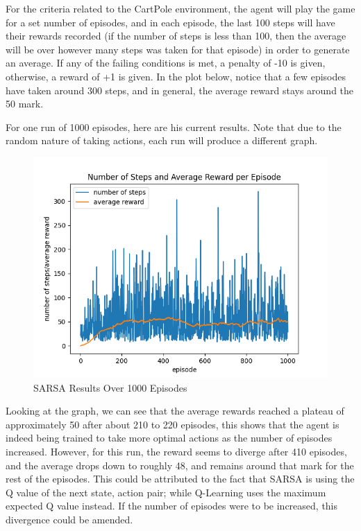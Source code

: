 \documentclass[nohyperref]{article}
\theoremstyle{plain}
\theoremstyle{definition}
\theoremstyle{remark}
\begin{document}
For the criteria related to the CartPole environment, the agent will play the game for a set number of episodes, and in each episode, the last 100 steps will have their rewards recorded (if the number of steps is less than 100, then the average will be over however many steps was taken for that episode) in order to generate an average.
If any of the failing conditions is met, a penalty of -10 is given, otherwise, a reward of +1 is given. In the plot below, notice that a few episodes have taken around 300 steps, and in general, the average reward stays around the 50 mark.

For one run of 1000 episodes, here are his current results. Note that due to the random nature of taking actions, each run will produce a different graph.

\begin{figure}[H] %
    \centering
    \includegraphics[width=1\linewidth]{sarsa-average-1k.png}
    \caption{SARSA Results Over 1000 Episodes}
\end{figure}

Looking at the graph, we can see that the average rewards reached a plateau of approximately 50 after about 210 to 220 episodes, this shows that the agent is indeed being trained to
take more optimal actions as the number of episodes increased. However, for this run, the reward seems to diverge after 410 episodes, and the average drops down to roughly 48, and remains around
that mark for the rest of the episodes. This could be attributed to the fact that SARSA is using the Q value of the next state, action pair; while Q-Learning uses the maximum expected Q value instead.
If the number of episodes were to be increased, this divergence could be amended.
\end{document}
